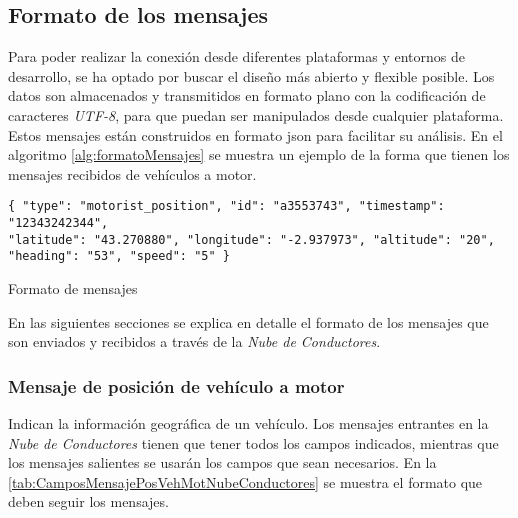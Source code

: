 \subsection{Formato de los mensajes}\label{ssection:FormatoMensajesNC}
Para poder realizar la conexión desde diferentes plataformas y entornos de desarrollo,
se ha optado por buscar el diseño más abierto y flexible posible. Los datos son almacenados
y transmitidos en formato plano con la codificación de caracteres \emph{UTF-8}, para
que puedan ser manipulados desde cualquier plataforma. Estos mensajes están construidos
en formato \gls{json} para facilitar su análisis. En el algoritmo \ref{alg:formatoMensajes} se 
muestra un ejemplo de la forma que tienen los mensajes recibidos de vehículos a motor.

\begin{listing}
	\begin{minipage}{.4\textwidth}
		\begin{verbatim}
{ "type": "motorist_position", "id": "a3553743", "timestamp": "12343242344",
"latitude": "43.270880", "longitude": "-2.937973", "altitude": "20",
"heading": "53", "speed": "5" }
		\end{verbatim}
	\end{minipage}
	\caption{Formato de mensajes}\label{alg:formatoMensajes}
\end{listing}

En las siguientes secciones se explica en detalle el formato de los mensajes que
son enviados y recibidos a través de la \emph{Nube de Conductores}.

\subsubsection{Mensaje de posición de vehículo a motor}\label{sssection:MensajePosVehMotor}
Indican la información geográfica de un vehículo. Los mensajes entrantes en la
\emph{Nube de Conductores} tienen que tener todos los campos indicados, mientras
que los mensajes salientes se usarán los campos que sean necesarios. En la
\ref{tab:CamposMensajePosVehMotNubeConductores} se muestra el formato que
deben seguir los mensajes.

